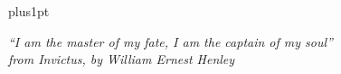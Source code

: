 \documentclass[twoside,11pt]{Latex/Classes/PhDthesisPSnPDF}
\begin{document}
\newpage


       
\hfuzz=50pt






\renewcommand\baselinestretch{1.2}
\baselineskip=18pt plus1pt



\begin{center}
\textit{``I am the master of my fate, I am the captain of my soul'' \\ from {\em Invictus}, by William Ernest Henley}
\end{center}


\newpage
%
%
%
%








%   
\end{document}
